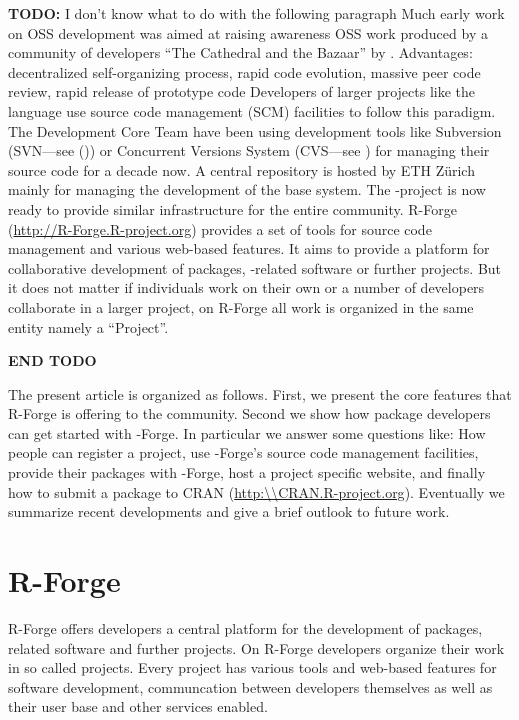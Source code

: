 \textbf{TODO: } I don't know what to do with the following paragraph
Much early work on OSS development was aimed at raising awareness  OSS
work produced by a community of developers ``The Cathedral and the
Bazaar'' by \cite{forge:Raymond:1999}.
Advantages:
decentralized self-organizing process, rapid code evolution, massive
peer code review, rapid release of prototype code
Developers of larger projects like the language \R{} use source code
management (SCM) facilities to follow this paradigm.
The \R{} Development Core Team have been using
development tools like Subversion (SVN---see
(\citep{forge:Pilato+Collins-Sussman+Fitzpatrick:2004})) or 
Concurrent Versions System (CVS---see \citep{forge:Cederqvist:2006})
for managing their source code for a decade now.  
A central repository is hosted by ETH Z\"urich mainly for
managing the development of the base \R{} system. The
\R{}-project is now ready to provide similar infrastructure
for the entire \R{} community.
R-Forge (\url{http://R-Forge.R-project.org}) provides a set of tools
for source code management and various web-based
features. It aims to provide a platform for collaborative development of
\R{} packages, \R{}-related software or further projects. But it does not
matter if individuals work on their own or a number of developers
collaborate in a larger project, on R-Forge all work is organized in
the same entity namely a ``Project''. 

\textbf{END TODO}

The present article is organized as follows. First, we present the core
features that R-Forge is offering to the \R{} community. Second we
show how package developers can get started with 
\R{}-Forge. In particular we answer some questions like: How people can
register a project, use \R{}-Forge's source code management facilities, provide their
packages with \R{}-Forge, host a project specific website, and
finally how to submit a package to CRAN
(\url{http:\\CRAN.R-project.org}).
Eventually we summarize recent developments and give a brief outlook
to future work.

\section{R-Forge}
R-Forge offers developers a central platform for the development of \R{} packages, \R{}
related software and further projects. On R-Forge developers organize their work
in so called projects. Every project has various tools and web-based features
for software development, communcation between developers themselves
as well as their
user base and other services enabled.

